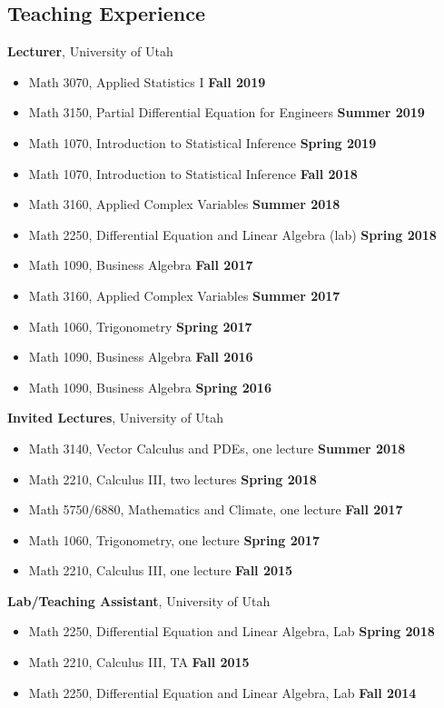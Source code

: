 \documentclass[margin,line]{res}
\begin{document}
\begin{resume}
\section{\sc Teaching Experience}
{\bf Lecturer}, University of Utah
\vspace*{.05in}
\begin{itemize}
\item[ ] Math 3070, Applied Statistics I \hfill {\bf Fall 2019}
\item[ ] Math 3150, Partial Differential Equation for Engineers \hfill {\bf Summer 2019}
\item[ ] Math 1070, Introduction to Statistical Inference \hfill {\bf Spring 2019}
\item[ ] Math 1070, Introduction to Statistical Inference \hfill {\bf Fall 2018}
\item[ ] Math 3160, Applied Complex Variables \hfill {\bf Summer 2018}
\item[ ] Math 2250, Differential Equation and Linear Algebra (lab) \hfill {\bf Spring 2018}
\item[ ] Math 1090, Business Algebra \hfill {\bf Fall 2017}
\item[ ] Math 3160, Applied Complex Variables \hfill {\bf Summer 2017}
\item[ ] Math 1060, Trigonometry \hfill {\bf Spring 2017}
\item[ ] Math 1090, Business Algebra \hfill {\bf Fall 2016}
\item[ ] Math 1090, Business Algebra \hfill {\bf Spring 2016}
\end{itemize}
{\bf Invited Lectures}, University of Utah
\vspace*{.05in}
\begin{itemize}
\item[ ] Math 3140, Vector Calculus and PDEs, one lecture \hfill {\bf Summer 2018}
\item[ ] Math 2210, Calculus III, two lectures \hfill {\bf Spring 2018}
\item[ ] Math 5750/6880, Mathematics and Climate, one lecture \hfill {\bf Fall 2017}
\item[ ] Math 1060, Trigonometry, one lecture \hfill {\bf Spring 2017}
\item[ ] Math 2210, Calculus III, one lecture \hfill {\bf Fall 2015}
\end{itemize}
{\bf Lab/Teaching Assistant}, University of Utah
\vspace*{.05in}
\begin{itemize}
\item[ ] Math 2250, Differential Equation and Linear Algebra, Lab \hfill {\bf Spring 2018}
\item[ ] Math 2210, Calculus III, TA \hfill {\bf Fall 2015}
\item[ ] Math 2250, Differential Equation and Linear Algebra, Lab \hfill {\bf Fall 2014}
\end{itemize}


\end{resume}
\end{document}
